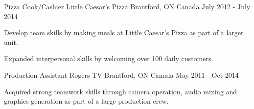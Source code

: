 \begin{cventries}

\cventry
{Pizza Cook/Cashier} %
{Little Caesar's Pizza} %
{Brantford, ON Canada} %
{July 2012 - July 2014} %
{ %
	\begin{cvitems}
		\item {Develop team skills by making meals at Little Caesar's Pizza as 
		part of 
			a larger unit.}
		\item {Expanded interpersonal skills by welcoming over 100 daily 
		customers.}
	\end{cvitems} 
}


\cventry
{Production Assistant} %
{Rogers TV} %
{Brantford, ON Canada} %
{May 2011 - Oct 2014} %
{ %
	\begin{cvitems}
		\item {Acquired strong teamwork skills through camera operation, audio 
			mixing and graphics generation as part of a large production crew.}
	\end{cvitems} 
}


\end{cventries}